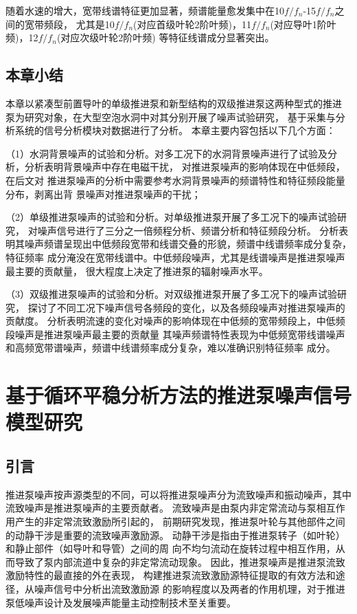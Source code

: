 随着水速的增大，宽带线谱特征更加显著，频谱能量愈发集中在10$f/f_n$-15$f/f_n$之间的宽带频段，
尤其是10$f/f_n$(对应首级叶轮2阶叶频)，11$f/f_n$(对应导叶1阶叶频)，12$f/f_n$(对应次级叶轮2阶叶频)
等特征线谱成分显著突出。
\section{本章小结}
本章以紧凑型前置导叶的单级推进泵和新型结构的双级推进泵这两种型式的推进
泵为研究对象，在大型空泡水洞中对其分别开展了噪声试验研究，
基于采集与分析系统的信号分析模块对数据进行了分析。
本章主要内容包括以下几个方面：

（1）水洞背景噪声的试验和分析。对多工况下的水洞背景噪声进行了试验及分析，分析表明背景噪声中存在电磁干扰，
对推进泵噪声的影响体现在中低频段，在后文对
推进泵噪声的分析中需要参考水洞背景噪声的频谱特性和特征频段能量分布，剥离出背
景噪声对推进泵噪声的干扰；

（2）单级推进泵噪声的试验和分析。对单级推进泵开展了多工况下的噪声试验研究，
对噪声信号进行了三分之一倍频程分析、频谱分析和特征频段分析。
分析表明其噪声频谱呈现出中低频段宽带和线谱交叠的形貌，频谱中线谱频率成分复杂，特征频率
成分淹没在宽带线谱中。中低频段噪声，尤其是线谱噪声是推进泵噪声最主要的贡献量，
很大程度上决定了推进泵的辐射噪声水平。

（3）双级推进泵噪声的试验和分析。对双级推进泵开展了多工况下的噪声试验研究，
探讨了不同工况下噪声信号各频段的变化，以及各频段噪声对推进泵噪声的
贡献度。
分析表明流速的变化对噪声的影响体现在中低频的宽带频段上，中低频段噪声是推进泵噪声最主要的贡献量
其噪声频谱特性表现为中低频宽带线谱噪声和高频宽带谱噪声，频谱中线谱频率成分复杂，难以准确识别特征频率
成分。
\chapter{基于循环平稳分析方法的推进泵噪声信号模型研究}
\section{引言}
推进泵噪声按声源类型的不同，可以将推进泵噪声分为流致噪声和振动噪声，其中流致噪声是推进泵噪声的主要贡献者。
流致噪声是由泵内非定常流动与泵相互作用产生的非定常流致激励所引起的，
前期研究发现，推进泵叶轮与其他部件之间的动静干涉是重要的流致噪声激励源。
动静干涉是指由于推进泵转子（如叶轮）和静止部件（如导叶和导管）之间的周
向不均匀流动在旋转过程中相互作用，从而导致了泵内部流道中复杂的非定常流动现象。
因此，推进泵噪声是推进泵流致激励特性的最直接的外在表现，
构建推进泵流致激励源特征提取的有效方法和途径，从噪声信号中分析出流致激励源
的影响程度以及两者的作用机理，对于推进泵低噪声设计及发展噪声能量主动控制技术至关重要。


